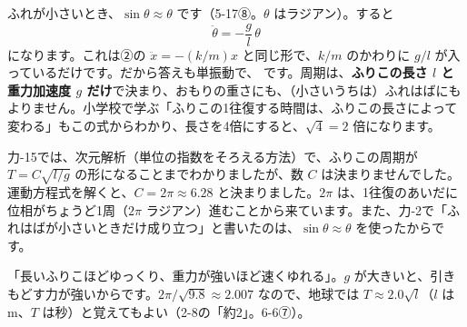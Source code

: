 ふれが小さいとき、$\sin\theta\approx\theta$ です（5-17⑧。$\theta$ はラジアン）。すると
\[\ddot\theta=-\frac{g}{l}\,\theta\]
になります。これは②の $\ddot x=-(k/m)x$ と同じ形で、$k/m$ のかわりに $g/l$ が入っているだけです。だから答えも単振動で、
\label{ph:波-1:furiko}です。周期は、\textbf{ふりこの長さ $l$ と重力加速度 $g$ だけ}で決まり、おもりの重さにも、（小さいうちは）ふれはばにもよりません。小学校で学ぶ「ふりこの1往復する時間は、ふりこの長さによって変わる」もこの式からわかり、長さを4倍にすると、$\sqrt4=2$ 倍になります。

\begin{phflow}[ふりこ]
\end{phflow}

力-15では、次元解析（単位の指数をそろえる方法）で、ふりこの周期が $T=C\sqrt{l/g}$ の形になることまでわかりましたが、数 $C$ は決まりませんでした。運動方程式を解くと、$C=2\pi\approx6.28$ と決まりました。$2\pi$ は、1往復のあいだに位相がちょうど1周（$2\pi$ ラジアン）進むことから来ています。また、力-2で「ふれはばが小さいときだけ成り立つ」と書いたのは、$\sin\theta\approx\theta$ を使ったからです。

\begin{phyomi}[$T=2\pi\sqrt{\dfrac{l}{g}}$]
「長いふりこほどゆっくり、重力が強いほど速くゆれる」。$g$ が大きいと、引きもどす力が強いからです。$2\pi/\sqrt{9.8}\approx2.007$ なので、地球では $T\approx2.0\sqrt{l}$（$l$ はm、$T$ は秒）と覚えてもよい（2-8の「約2」。6-6⑦）。
\end{phyomi}

